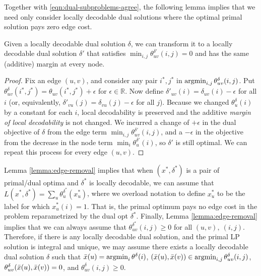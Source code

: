 Together with \eqref{eqn:dual-subproblems-agree}, the following lemma implies that we need only consider locally decodable dual solutions where the optimal primal solution pays zero edge cost.
\begin{lemma}\label{lemma:edge-removal}
  Given a locally decodable dual solution $\delta$, we can transform
  it to a locally decodable dual solution $\delta'$ that satisfies
  $\min_{i,j}\theta_{uv}^{\delta'}(i,j) = 0$ and has the same (additive) margin at every node.
\end{lemma}
\begin{proof}
  Fix an edge $(u,v)$, and consider any pair $i^*,j^*$ in $\operatorname*{\text{argmin}}_{i,j}\theta_{uv}^{\delta}(i,j)$. Put $\theta^\delta_{uv}(i^*,j^*) = \theta_{uv}(i^*,j^*) + \epsilon$ for $\epsilon \in \mathbb{R}$. Now define $\delta'_{uv}(i) = \delta_{uv}(i) - \epsilon$ for all $i$ (or, equivalently, $\delta'_{vu}(j) = \delta_{vu}(j) - \epsilon$ for all $j$). Because we changed $\theta^{\delta}_u(i)$ by a constant for each $i$, local decodability is preserved and the additive \emph{margin of local decodability} is not changed. We incurred a change of $+\epsilon$ in the dual objective of $\delta$ from the edge term $\min_{i,j} \theta_{uv}^{\delta'}(i,j)$, and a $-\epsilon$ in the objective from the decrease in the node term $\min_i \theta^{\delta'}_u(i)$, so $\delta'$ is still optimal. We can repeat this process for every edge $(u,v)$.
\end{proof}
Lemma \ref{lemma:edge-removal} implies that when $(x^*,\delta^*)$ is a
pair of primal/dual optima and $\delta^*$ is locally decodable, we can assume that $L(x^*,\delta^*) = \sum_u\theta^{\delta^*}_u(x^*_u)$, where we overload notation to define $x^*_u$ to be the label for which $x^*_u(i) = 1$. That is, the primal optimum pays no edge cost in the problem reparametrized by the dual opt $\delta^*$. Finally, Lemma \ref{lemma:edge-removal} implies that we can always assume that $\theta_{uv}^{\delta^*}(i,j) \ge 0$ for all $(u,v),\ (i,j)$. Therefore, if there is any locally decodable dual solution, and the primal LP solution is integral and unique, we may assume there exists a locally decodable dual solution $\delta$ such that $\bar{x}(u) = \operatorname*{\text{argmin}}_i\theta^{\delta}(i)$, $(\bar{x}(u), \bar{x}(v)) \in \operatorname*{\text{argmin}}_{i,j}\theta^{\delta}_{uv}(i,j)$, $\theta^{\delta}_{uv}(\bar{x}(u),\bar{x}(v)) = 0$, and $\theta^{\delta}_{uv}(i,j) \ge 0$.

